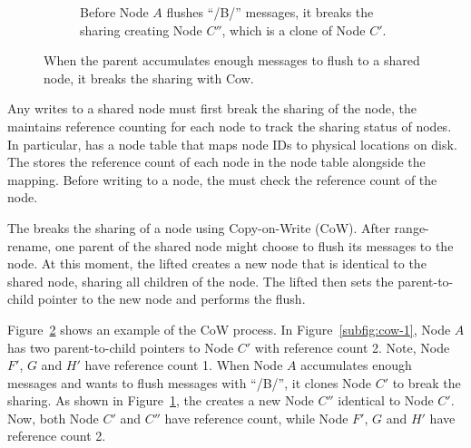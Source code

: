 \begin{figure}
\begin{subfigure}{\textwidth}
        \caption{\label{subfig:cow-2} Before Node $A$ flushes ``/B/'' messages,
            it breaks the sharing creating Node $C''$, which is a clone of Node
            $C'$.}
    \end{subfigure}
    \caption[\bedags break node sharing with CoW]{\label{fig:cow}
        When the parent accumulates enough messages to flush to a shared node,
        it breaks the sharing with Cow.}
\end{figure}

Any writes to a shared node must first break the sharing of the node, the
\bedag maintains reference counting for each node to track the sharing status of
nodes.
In particular, \fti has a node table that maps node IDs to physical locations on
disk.
The \bedag stores the reference count of each node in the node table alongside
the mapping.
Before writing to a node, the \bedag must check the reference count of the node.

The \bedag breaks the sharing of a node using Copy-on-Write (CoW).
After range-rename, one parent of the shared node might choose to flush its
messages to the node.
At this moment, the lifted \bedag creates a new node that is identical to the
shared node, sharing all children of the node.
The lifted \bedag then sets the parent-to-child pointer to the new node and
performs the flush.

Figure~\ref{fig:cow} shows an example of the CoW process.
In Figure~\ref{subfig:cow-1}, Node $A$ has two parent-to-child pointers to
Node $C'$ with reference count 2.
Note, Node $F'$, $G$ and $H'$ have reference count 1.
When Node $A$ accumulates enough messages and wants to flush messages with
``/B/'', it clones Node $C'$ to break the sharing.
As shown in Figure~\ref{subfig:cow-2}, the \bedag creates a new Node $C''$
identical to Node $C'$.
Now, both Node $C'$ and $C''$ have reference count, while Node $F'$, $G$ and
$H'$ have reference count 2.


